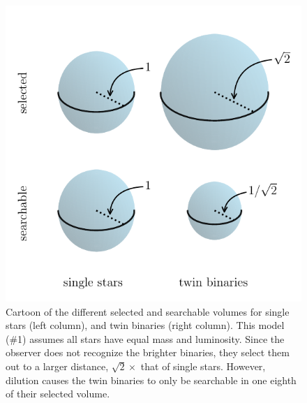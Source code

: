 \newpage
\begin{figure}
    \begin{center}
        \includegraphics[width=\textwidth]{figures/visualize_volumes.pdf}
    \end{center}
    \caption{
    Cartoon of the different selected and searchable volumes for single 
    stars (left column), and twin binaries (right column).
    This model (\#1) assumes all stars have equal mass and luminosity.
    Since the observer does not recognize the brighter binaries, they select 
    them out to a larger distance, $\sqrt{2}\times$ that of single stars.
    However, dilution causes the twin binaries to only be searchable in one 
    eighth of their selected volume.
    }
    \label{fig:model_1_volumes}
\end{figure}


